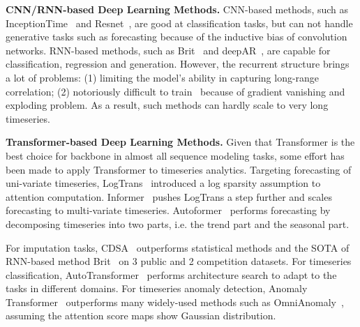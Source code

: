 \noindent\textbf{CNN/RNN-based Deep Learning Methods.}
CNN-based methods, such as InceptionTime~\cite{ismail2020inceptiontime} and Resnet~\cite{he2016deep}, are good at classification tasks, but can not handle generative tasks such as forecasting because of the inductive bias of convolution networks. 
RNN-based methods, such as Brit~\cite{cao2018brits} and deepAR~\cite{salinas2020deepar}, are capable for classification, regression and generation. However, the recurrent structure brings a lot of problems: (1) limiting the model's ability in capturing long-range correlation; (2) notoriously difficult to train~\cite{pascanu2013difficulty} because of gradient vanishing and exploding problem. As a result, such methods can hardly scale to very long timeseries. 

\noindent\textbf{Transformer-based Deep Learning Methods.}
Given that Transformer is the best choice for backbone in almost all sequence modeling tasks, some effort has been made to apply Transformer to timeseries analytics.
Targeting forecasting of uni-variate timeseries, LogTrans~\cite{li2019enhancing} introduced a log sparsity assumption to attention computation.
Informer~\cite{zhou2021informer} pushes LogTrans a step further and scales forecasting to multi-variate timeseries. Autoformer~\cite{wu2021autoformer} performs forecasting by decomposing timeseries into two parts, i.e. the trend part and the seasonal part.

For imputation tasks, CDSA~\cite{ma2019cdsa} outperforms statistical methods and the SOTA of RNN-based method Brit~\cite{cao2018brits} on 3 public and 2 competition datasets. 
For timeseries classification, AutoTransformer~\cite{ren2022autotransformer} performs architecture search to adapt to the tasks in different domains. 
For timeseries anomaly detection, Anomaly Transformer~\cite{xu2021anomaly} outperforms many widely-used methods such as OmniAnomaly~\cite{su2019robust}, assuming the attention score maps show Gaussian distribution.

